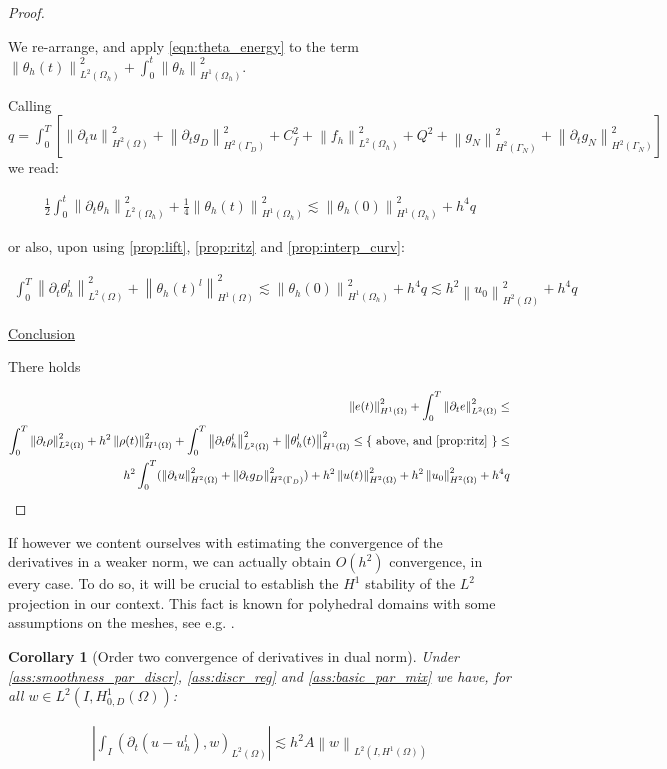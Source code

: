 \documentclass[english,a4paper,10pt,oneside]{scrbook}	%
\theoremstyle{break}
\newtheorem{cor}[equation]{Corollary}
\newenvironment{mproof}[1][\proofname]{%
  \begin{proof}[#1]$ $\par\nobreak\ignorespaces
}{%
  \end{proof}
}
\renewcommand*{\proofname}{Proof}
\theoremstyle{remark}
\newcommand{\ds}{\displaystyle}
\newcommand{\norm}[1]{\left\lVert#1\right\rVert}
\newcommand{\ind}[1]{\{\text{ #1 }\}}
\begin{document}
\begin{mproof}
We re-arrange, and apply \cref{eqn:theta_energy} to the term $\ds \norm{ \theta_h(t)}^2_{L^2(\Omega_h)} + \int_0^t \norm{ \theta_h}_{H^1(\Omega_h)}^2$. 

Calling $q=\ds \int_0^T \left [ \norm{\partial_t u}_{H^2(\Omega)}^2 +	\norm{\partial_t g_D}_{H^2(\Gamma_D)}^2 + C_f^2 +  \norm{f_h}_{L^2(\Omega_h)}^2 + Q^2+ \norm{g_N}_{H^2(\Gamma_N)}^2 + \norm{\partial_t g_N}_{H^2(\Gamma_N)}^2 \right ] $ we read:


\begin{align*}
\frac{1}{2}\int_0^t\norm{\partial_t \theta_h}^2_{L^2(\Omega_h)} + \frac{1}{4} \norm{\theta_h(t)}_{H^1(\Omega_h)}^2 \lesssim  \norm{\theta_h(0)}_{H^1(\Omega_h)}^2+ h^4q
\end{align*}

or also, upon using \cref{prop:lift}, \cref{prop:ritz} and \cref{prop:interp_curv}:

\begin{align*}
\int_0^T\norm{\partial_t \theta_h^l}^2_{L^2(\Omega)} + \norm{\theta_h(t)^l}_{H^1(\Omega)}^2 \lesssim  \norm{\theta_h(0)}_{H^1(\Omega_h)}^2+ h^4q \lesssim h^2\norm{u_0}_{H^2(\Omega)}^2+ h^4q
\end{align*}

\underline{Conclusion}

There holds 

\begin{align*}
\norm{e(t)}_{H^1(\Omega)}^2 + \int_0^T\norm{\partial_t e}^2_{L^2(\Omega)}  \leq \\
\int_0^T\norm{\partial_t \rho}^2_{L^2(\Omega)} + h^2\norm{\rho(t)}_{H^1(\Omega)}^2 + \int_0^T\norm{\partial_t  \theta_h^l}^2_{L^2(\Omega)} + \norm{ \theta_h^l(t)}_{H^1(\Omega)}^2\leq \ind{above, and \cref{prop:ritz}}\leq \\
h^2\int_0^T(\norm{\partial_t u }_{H^2(\Omega)}^2 + \norm{\partial_t g_D }_{H^2(\Gamma_D)}^2) + h^2\norm{u(t)}_{H^2(\Omega)}^2 +  h^2\norm{u_0}_{H^2(\Omega)}^2+ h^4q
\end{align*}

\end{mproof}

If however we content ourselves with estimating the convergence of the derivatives in a weaker norm, we can actually obtain $O(h^2)$ convergence, in every case. To do so, it will be crucial to establish the $H^1$ stability of the $L^2$ projection in our context. This fact is known for polyhedral domains with some assumptions on the meshes, see e.g. \cite{yserentant}.

\begin{cor}[Order two convergence of derivatives in dual norm]
\label{cor:deriv_est_semid}
Under \cref{ass:smoothness_par_discr}, \cref{ass:discr_reg} and \cref{ass:basic_par_mix} we have, for all $w \in L^2(I,H^1_{0,D}(\Omega))$:

\begin{align*}
\left | \int_I (\partial_t(u-u_h^l), w)_{L^2(\Omega)}\right |\lesssim h^2 A \norm{w}_{L^2(I,H^1(\Omega))}
\end{align*}

\end{cor}
\end{document}
